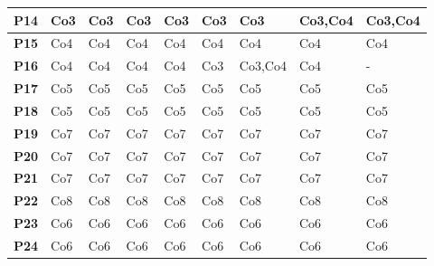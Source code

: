 \begin{table}[!htb]
\begin{tabular}{|M{1.0cm}|M{1.6cm}|M{1.6cm}|M{1.6cm}|M{1.6cm}|M{1.6cm}|M{1.6cm}|M{1.6cm}|M{1.6cm}|}
\textbf{P14}                   & Co3            & Co3            & Co3            & Co3            & Co3            & Co3            & Co3,Co4        & Co3,Co4        \\ \hline

\textbf{P15}                   & Co4            & Co4            & Co4            & Co4            & Co4            & Co4            & Co4            & Co4            \\ \hline

\textbf{P16}                   & Co4            & Co4            & Co4            & Co4            & Co3            & Co3,Co4        & Co4            &    -            \\ \hline

\textbf{P17}                   & Co5            & Co5            & Co5            & Co5            & Co5            & Co5            & Co5            & Co5            \\ \hline

\textbf{P18}                   & Co5            & Co5            & Co5            & Co5            & Co5            & Co5            & Co5            & Co5            \\ \hline

\textbf{P19}                   & Co7            & Co7            & Co7            & Co7            & Co7            & Co7            & Co7            & Co7            \\ \hline

\textbf{P20}                   & Co7            & Co7            & Co7            & Co7            & Co7            & Co7            & Co7            & Co7            \\ \hline

\textbf{P21}                   & Co7            & Co7            & Co7            & Co7            & Co7            & Co7            & Co7            & Co7            \\ \hline

\textbf{P22}                   & Co8            & Co8            & Co8            & Co8            & Co8            & Co8            & Co8            & Co8            \\ \hline

\textbf{P23}                   & Co6            & Co6            & Co6            & Co6            & Co6            & Co6            & Co6            & Co6            \\ \hline

\textbf{P24}                   & Co6            & Co6            & Co6            & Co6            & Co6            & Co6            & Co6            & Co6            \\ \hline


\end{tabular}
\end{table}
